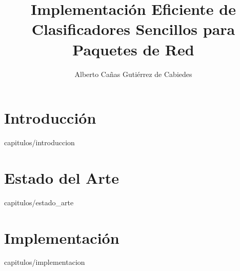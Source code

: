 \documentclass[final, epsbased]{tfgtfmthesisuam}
\title{Implementación Eficiente de Clasificadores Sencillos para Paquetes de Red}
\author{Alberto Cañas Gutiérrez de Cabiedes}
\begin{document}
\chapter{Introducción}{capitulos/introduccion}
\chapter{Estado del Arte}{capitulos/estado_arte}
\chapter{Implementación}{capitulos/implementacion}

\printglossary


\end{document}
